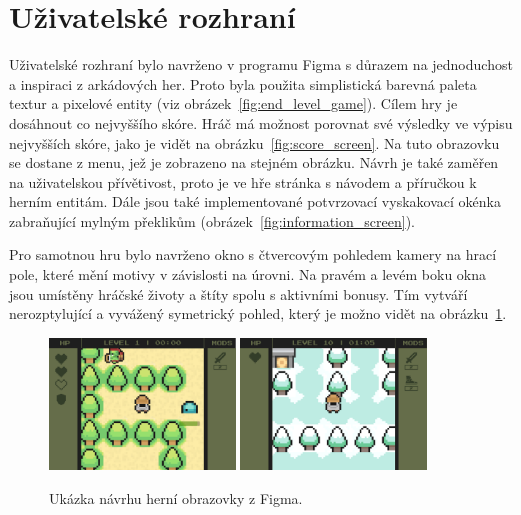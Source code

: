 \section{Uživatelské rozhraní}
Uživatelské rozhraní bylo navrženo v programu Figma s důrazem na jednoduchost a inspiraci z arkádových her. Proto byla použita simplistická barevná paleta textur a pixelové entity (viz obrázek~\ref{fig:end_level_game}). Cílem hry je dosáhnout co nejvyššího skóre. Hráč má možnost porovnat své výsledky ve výpisu nejvyšších skóre, jako je vidět na obrázku~\ref{fig:score_screen}. Na tuto obrazovku se dostane z menu, jež je zobrazeno na stejném obrázku. Návrh je také zaměřen na uživatelskou přívětivost, proto je ve hře stránka s návodem a příručkou k herním entitám. Dále jsou také implementované potvrzovací vyskakovací okénka zabraňující mylným překlikům (obrázek~\ref{fig:information_screen}). 

Pro samotnou hru bylo navrženo okno s čtvercovým pohledem kamery na hrací pole, které mění motivy v závislosti na úrovni. Na pravém a levém boku okna jsou umístěny hráčské životy a štíty spolu s aktivními bonusy. Tím vytváří nerozptylující a vyvážený symetrický pohled, který je možno vidět na obrázku~\ref{fig:game_screen}.

\begin{figure}[hb]
    \vspace{0.2cm}
    \centering
    \includegraphics[width=0.44\textwidth]{obrazky-figures/ch3/game_screen.png}\hspace{0.1cm}
    \includegraphics[width=0.44\textwidth]{obrazky-figures/ch3/Game_screen-WINTER_BLOCK.png}
    \caption{Ukázka návrhu herní obrazovky z Figma.}
    \label{fig:game_screen}
\end{figure}


